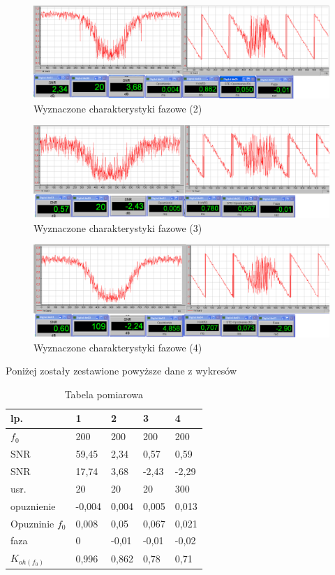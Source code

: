 \documentclass{classrep}
\begin{document}
\begin{figure}[H]
	\centering
	\includegraphics[width=0.8\linewidth]{wyk14}
	\caption{ Wyznaczone charakterystyki fazowe (2)}
	\label{fig:wyk14}
\end{figure}

\begin{figure}[H]
	\centering
	\includegraphics[width=0.8\linewidth]{wyk15}
	\caption{ Wyznaczone charakterystyki fazowe (3)}
	\label{fig:wyk15}
\end{figure}

\begin{figure}[H]
	\centering
	\includegraphics[width=0.8\linewidth]{wyk16}
	\caption{ Wyznaczone charakterystyki fazowe (4)}
	\label{fig:wyk16}
\end{figure}

Poniżej zostały zestawione powyższe dane z wykresów

\begin{table}[H]
	\centering
	\caption{Tabela pomiarowa}
	\label{my-label}
	\begin{tabular}{|l|l|l|l|l|}
		\hline
		lp.             & 1      & 2     & 3     & 4     \\ \hline
		$f_0$           & 200    & 200   & 200   & 200   \\ \hline
		SNR             & 59,45  & 2,34  & 0,57  & 0,59  \\ \hline
		SNR             & 17,74  & 3,68  & -2,43 & -2,29 \\ \hline
		usr.            & 20     & 20    & 20    & 300   \\ \hline
		opuznienie      & -0,004 & 0,004 & 0,005 & 0,013 \\ \hline
		Opuzninie $f_0$ & 0,008  & 0,05  & 0,067 & 0,021 \\ \hline
		faza            & 0      & -0,01 & -0,01 & -0,02 \\ \hline
		$K_{oh(f_{0})}$ & 0,996  & 0,862 & 0,78  & 0,71  \\ \hline
	\end{tabular}
\end{table}
\end{document}
